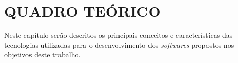 \chapter{QUADRO TEÓRICO}

	\par Neste capítulo serão descritos os principais conceitos e características
das tecnologias utilizadas para o desenvolvimento dos \textit{softwares}
propostos nos objetivos deste trabalho.













